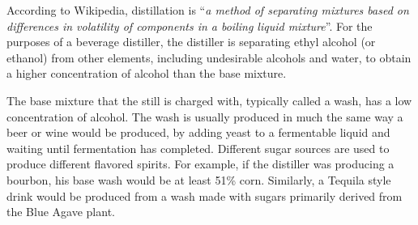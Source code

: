 According to Wikipedia, distillation is ``\emph{a method of separating mixtures
based on differences in volatility of components in a boiling liquid
mixture}''. For the purposes of a beverage distiller, the distiller is
separating ethyl alcohol (or ethanol) from other elements, including
undesirable alcohols and water, to obtain a higher concentration of alcohol
than the base mixture.

The base mixture that the still is charged with, typically called a wash, has a
low concentration of alcohol. The wash is usually produced in much the same way
a beer or wine would be produced, by adding yeast to a fermentable liquid
and waiting until fermentation has completed. Different sugar sources are used
to produce different flavored spirits. For example, if the distiller was
producing a bourbon, his base wash would be at least 51\% corn. Similarly, a
Tequila style drink would be produced from a wash made with sugars primarily
derived from the Blue Agave plant.


